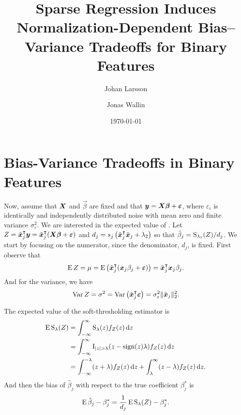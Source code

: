 


\newcommand{\mv}[1]{{\boldsymbol{\mathrm{#1}}}}

\title{Sparse Regression Induces Normalization-Dependent Bias--Variance Tradeoffs for Binary Features}
\author[1,*]{Johan Larsson}
\author[1]{Jonas Wallin}
\date{\today}

\usepackage[style=alphabetic]{biblatex}




\maketitle




\section{Bias-Variance Tradeoffs in Binary Features}

Now, assume that \(\boldsymbol{X}\) and \(\vec{\beta}\) are fixed and that \(\boldsymbol{y} = \boldsymbol{X}\boldsymbol{\beta} + \boldsymbol{\varepsilon}\), where \(\varepsilon_i\) is identically and independently distributed noise with mean zero and finite variance \(\sigma_\varepsilon^2\). We are interested in the expected value of . Let \(Z = \tilde{\boldsymbol{x}}_j^\intercal \boldsymbol{y} = \tilde{\boldsymbol{x}}_j^\intercal(\boldsymbol{X}\boldsymbol{\beta} + \boldsymbol{\varepsilon})\) and \(d_j = s_j\left(\tilde{\boldsymbol{x}}_j^\intercal \tilde{\boldsymbol{x}}_j + \lambda_2\right)\) so that \(\hat{\beta}_j = \operatorname{S}_{\lambda_1}(Z)/d_j\). We start by focusing on the numerator, since the denominator, \(d_j\), is fixed. First observe that
\[
  \operatorname{E} Z = \mu = \operatorname{E} \left( \tilde{\boldsymbol{x}}_j^\intercal (\boldsymbol{x}_j\beta_j + \boldsymbol{\varepsilon}) \right)  = \tilde{\boldsymbol{x}}_j^\intercal\boldsymbol{x}_j \beta_j.
\]
And for the variance, we have
\[
  \operatorname{Var} Z = \sigma^2 = \operatorname{Var}\left(\tilde{\boldsymbol{x}}_j ^\intercal \boldsymbol{\varepsilon}\right) = \sigma_\varepsilon^2 \lVert \tilde{\boldsymbol{x}}_j\rVert_2^2 .
\]

The expected value of the soft-thresholding estimator is
\begin{align}
  \label{eq:st-expected-value}
  \operatorname{E} \operatorname{S}_\lambda(Z) & = \int_{-\infty}^\infty \operatorname{S}_\lambda(z) f_Z(z) \mathop{}\!\mathrm{d} z                                                   \nonumber \\
                    & = \int_{-\infty}^\infty \operatorname{I}_{|z| > \lambda} (z -\operatorname{sign}(z)\lambda) f_Z(z) \mathop{}\!\mathrm{d} z                         \nonumber \\
                    & = \int_{-\infty}^{-\lambda}(z + \lambda)f_Z(z) \mathop{}\!\mathrm{d} z + \int_{\lambda}^\infty (z - \lambda)f_Z(z) \mathop{}\!\mathrm{d} z.
\end{align}
And then the bias of \(\hat\beta_j\) with respect to the true coefficient \(\beta_j^*\) is
\begin{equation}
  \label{eq:betahat-bias}
  \operatorname{E} \hat\beta_j - \beta_j^* = \frac{1}{d_j}\operatorname{E} \operatorname{S}_\lambda(Z) - \beta^*_j.
\end{equation}

